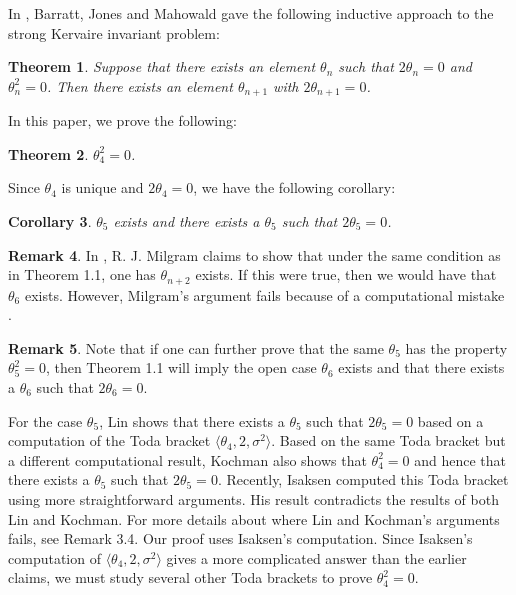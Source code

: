 \documentclass[psamsfonts]{amsart}
\newtheorem{thm}{Theorem}[section]
\newtheorem{cor}[thm]{Corollary}
\theoremstyle{definition}
\newtheorem{rem}[thm]{Remark}
\numberwithin{equation}{section}
\begin{document}
In \cite{BJM2}, Barratt, Jones and Mahowald gave the following inductive approach to the strong Kervaire invariant problem:

\begin{thm}
Suppose that there exists an element $\theta_n$ such that $2 \theta_n=0$ and $\theta_n^2=0$. Then there exists an element $\theta_{n+1}$ with $2 \theta_{n+1}=0$.
\end{thm}

In this paper, we prove the following:

\begin{thm}
$\theta_4^2=0$.
\end{thm}

Since $\theta_4$ is unique and $2 \theta_4=0$, we have the following corollary:

\begin{cor}
$\theta_5$ exists and there exists a $\theta_5$ such that $2 \theta_5=0$.
\end{cor}

\begin{rem}
In \cite{Mil}, R. J. Milgram claims to show that under the same condition as in Theorem 1.1, one has $\theta_{n+2}$ exists. If this were true, then we would have that $\theta_6$ exists. However, Milgram's argument fails because of a computational mistake \cite{Br3}.
\end{rem}

\begin{rem}
Note that if one can further prove that the same $\theta_5$ has the property $\theta_5^2=0$, then Theorem 1.1 will imply the open case $\theta_6$ exists and that there exists a $\theta_6$ such that $2 \theta_6=0$.\\
\end{rem}

For the case $\theta_5$, Lin \cite{Lin} shows that there exists a $\theta_5$ such that $2 \theta_5=0$ based on a computation of the Toda bracket $\langle \theta_4, 2, \sigma^2\rangle$. Based on the same Toda bracket but a different computational result, Kochman \cite{Ko} also shows that $\theta_4^2=0$ and hence that there exists a $\theta_5$ such that $2 \theta_5=0$. Recently, Isaksen \cite{DI2} computed this Toda bracket using more straightforward arguments. His result contradicts the results of both Lin and Kochman. For more details about where Lin and Kochman's arguments fails, see Remark 3.4. Our proof uses Isaksen's computation. Since Isaksen's computation of $\langle \theta_4, 2, \sigma^2\rangle$ gives a more complicated answer than the earlier claims, we must study several other Toda brackets to prove $\theta_4^2=0$.\\
\end{document}
